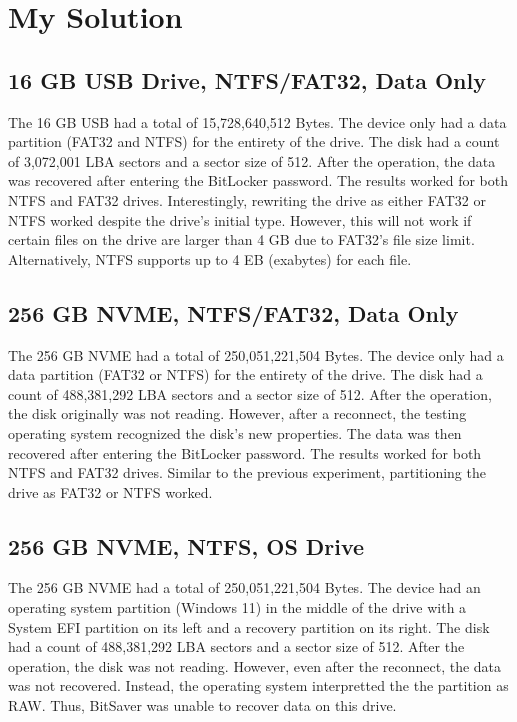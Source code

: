 \documentclass[conference]{IEEEtran} \IEEEoverridecommandlockouts
\begin{document}
\section{My Solution}

\subsection{16 GB USB Drive, NTFS/FAT32, Data Only}

The 16 GB USB had a total of 15,728,640,512 Bytes. The device only had a data partition (FAT32 and NTFS) for the entirety of the drive. The disk had
a count of 3,072,001 LBA sectors and a sector size of 512. After the operation, the data was recovered after entering the BitLocker password.
The results worked for both NTFS and FAT32 drives. Interestingly, rewriting the drive as either FAT32 or NTFS worked despite the drive's initial type. However, this will not work
if certain files on the drive are larger than 4 GB due to FAT32's file size limit. Alternatively, NTFS supports up to 4 EB (exabytes) for each file.

\subsection{256 GB NVME, NTFS/FAT32, Data Only}

The 256 GB NVME had a total of 250,051,221,504 Bytes. The device only had a data partition (FAT32 or NTFS) for the entirety of the drive. The disk had
a count of 488,381,292 LBA sectors and a sector size of 512. After the operation, the disk originally was
not reading. However, after a reconnect, the testing operating system recognized the disk's new properties. The data was then recovered after entering the BitLocker password.
The results worked for both NTFS and FAT32 drives. Similar to the previous experiment, partitioning the drive as FAT32 or NTFS worked.

\subsection{256 GB NVME, NTFS, OS Drive}

The 256 GB NVME had a total of 250,051,221,504 Bytes. The device had an operating system partition (Windows 11) in the middle of the drive with a System EFI partition on its
left and a recovery partition on its right. The disk had a count of 488,381,292 LBA sectors and a sector size of 512. After the operation, the disk was not reading. However,
even after the reconnect, the data was not recovered. Instead, the operating system interpretted the 
the partition as RAW. Thus, BitSaver was unable to recover data on this drive.
\end{document}
